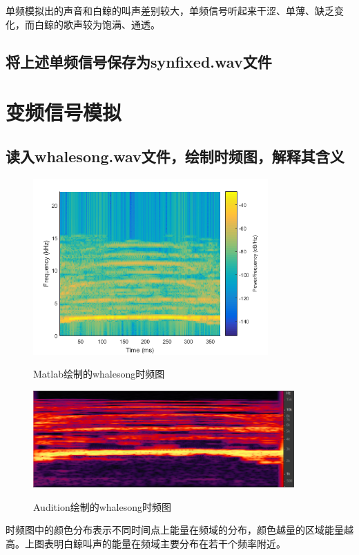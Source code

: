 \documentclass{article}
\begin{document}
            单频模拟出的声音和白鲸的叫声差别较大，单频信号听起来干涩、单薄、缺乏变化，而白鲸的歌声较为饱满、通透。

        \subsection{将上述单频信号保存为synfixed.wav文件}

    \section{变频信号模拟}
        \subsection{读入whalesong.wav文件，绘制时频图，解释其含义}
            \begin{figure}[htb]
                \centering
                \includegraphics[width=9cm]{figure5.png}
                \label{fig:originft-1}\caption{Matlab绘制的whalesong时频图}
            \end{figure}

            \begin{figure}[!htb]
                \centering
                \includegraphics[width=10cm]{figure6.png}
                \label{fig:originft-2}\caption{Audition绘制的whalesong时频图}
            \end{figure}

            时频图中的颜色分布表示不同时间点上能量在频域的分布，颜色越量的区域能量越高。上图表明白鲸叫声的能量在频域主要分布在若干个频率附近。
\end{document}
